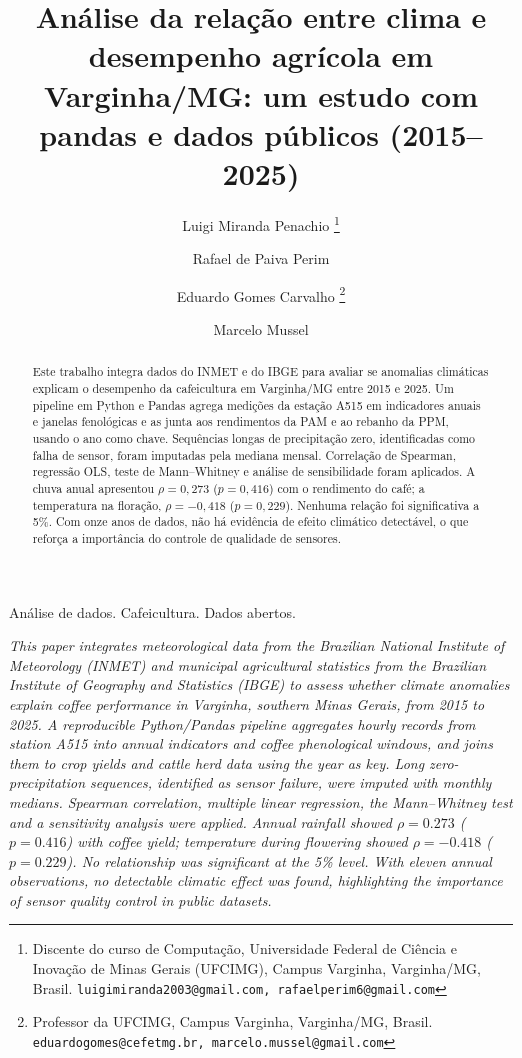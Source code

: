 \documentclass{RBCA}
\title{An\'alise da rela\c{c}\~ao entre clima e desempenho agr\'icola em Varginha/MG: um estudo com pandas e dados p\'ublicos (2015--2025)}
\author{
  Luigi Miranda Penachio
    \footnote{Discente do curso de Computa\c{c}\~ao, Universidade Federal de Ci\^encia e Inova\c{c}\~ao de Minas Gerais (UFCIMG), Campus Varginha, Varginha/MG, Brasil. \texttt{luigimiranda2003@gmail.com, rafaelperim6@gmail.com}}
  \and
  Rafael de Paiva Perim
    \footnotemark[1]
  \and
  Eduardo Gomes Carvalho
    \footnote{Professor da UFCIMG, Campus Varginha, Varginha/MG, Brasil. \texttt{eduardogomes@cefetmg.br, marcelo.mussel@gmail.com}}
  \and
  Marcelo Mussel
    \footnotemark[2]
}
\begin{document}
\maketitle
\thispagestyle{fancy}
\vspace{6pt}

\begin{abstract}
Este trabalho integra dados do INMET e do IBGE para avaliar se anomalias clim\'aticas explicam o desempenho da cafeicultura em Varginha/MG entre 2015 e 2025. Um pipeline em Python e Pandas agrega medi\c{c}\~oes da esta\c{c}\~ao A515 em indicadores anuais e janelas fenol\'ogicas e as junta aos rendimentos da PAM e ao rebanho da PPM, usando o ano como chave. Sequ\^encias longas de precipita\c{c}\~ao zero, identificadas como falha de sensor, foram imputadas pela mediana mensal. Correla\c{c}\~ao de Spearman, regress\~ao OLS, teste de Mann--Whitney e an\'alise de sensibilidade foram aplicados. A chuva anual apresentou $\rho=0,273$ ($p=0,416$) com o rendimento do caf\'e; a temperatura na flora\c{c}\~ao, $\rho=-0,418$ ($p=0,229$). Nenhuma rela\c{c}\~ao foi significativa a 5\%. Com onze anos de dados, n\~ao h\'a evid\^encia de efeito clim\'atico detect\'avel, o que refor\c{c}a a import\^ancia do controle de qualidade de sensores.
\end{abstract}

\begin{keywords}
An\'alise de dados. Cafeicultura. Dados abertos.
\end{keywords}

\vspace{6pt}

\begin{abstractinenglish}
\emph{This paper integrates meteorological data from the Brazilian National Institute of Meteorology (INMET) and municipal agricultural statistics from the Brazilian Institute of Geography and Statistics (IBGE) to assess whether climate anomalies explain coffee performance in Varginha, southern Minas Gerais, from 2015 to 2025. A reproducible Python/Pandas pipeline aggregates hourly records from station A515 into annual indicators and coffee phenological windows, and joins them to crop yields and cattle herd data using the year as key. Long zero-precipitation sequences, identified as sensor failure, were imputed with monthly medians. Spearman correlation, multiple linear regression, the Mann--Whitney test and a sensitivity analysis were applied. Annual rainfall showed $\rho=0.273$ ($p=0.416$) with coffee yield; temperature during flowering showed $\rho=-0.418$ ($p=0.229$). No relationship was significant at the 5\% level. With eleven annual observations, no detectable climatic effect was found, highlighting the importance of sensor quality control in public datasets.}
\end{abstractinenglish}
\end{document}
